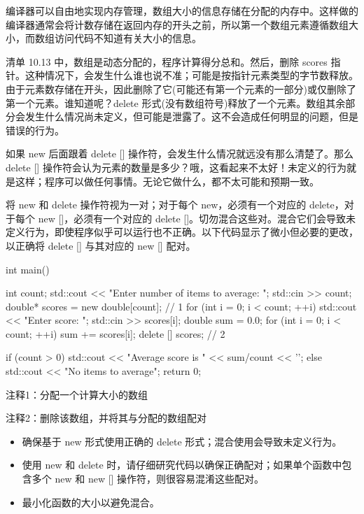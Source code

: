 编译器可以自由地实现内存管理，数组大小的信息存储在分配的内存中。这样做的编译器通常会将计数存储在返回内存的开头之前，所以第一个数组元素遵循数组大小，而数组访问代码不知道有关大小的信息。

清单 10.13 中，数组是动态分配的，程序计算得分总和。然后，删除 scores 指针。这种情况下，会发生什么谁也说不准；可能是按指针元素类型的字节数释放。由于元素数存储在开头，因此删除了它(可能还有第一个元素的一部分)或仅删除了第一个元素。谁知道呢？delete 形式(没有数组符号)释放了一个元素。数组其余部分会发生什么情况尚未定义，但可能是泄露了。这不会造成任何明显的问题，但是错误的行为。

如果 new 后面跟着 delete [] 操作符，会发生什么情况就远没有那么清楚了。那么 delete [] 操作符会认为元素的数量是多少？哦，这看起来不太好！未定义的行为就是这样；程序可以做任何事情。无论它做什么，都不太可能和预期一致。


将 new 和 delete 操作符视为一对；对于每个 new，必须有一个对应的 delete，对于每个 new []，必须有一个对应的 delete []。切勿混合这些对。混合它们会导致未定义行为，即使程序似乎可以运行也不正确。以下代码显示了微小但必要的更改，以正确将 delete [] 与其对应的 new [] 配对。


\begin{cpp}
int main() {
  int count;
  std::cout << "Enter number of items to average: ";
  std::cin >> count;
  double* scores = new double[count]; // 1
  for (int i = 0; i < count; ++i) {
    std::cout << "Enter score: ";
    std::cin >> scores[i];
  }
  double sum = 0.0;
  for (int i = 0; i < count; ++i)
    sum += scores[i];
  delete [] scores; // 2

  if (count > 0)
    std::cout << "Average score is " << sum/count << '\n';
  else
    std::cout << "No items to average\n";
  return 0;
}
\end{cpp}

{\footnotesize
注释1：分配一个计算大小的数组

注释2：删除该数组，并将其与分配的数组配对
}


\begin{itemize}
\item
确保基于 new 形式使用正确的 delete 形式；混合使用会导致未定义行为。

\item
使用 new 和 delete 时，请仔细研究代码以确保正确配对；如果单个函数中包含多个 new 和 new [] 操作符，则很容易混淆这些配对。

\item
最小化函数的大小以避免混合。
\end{itemize}






